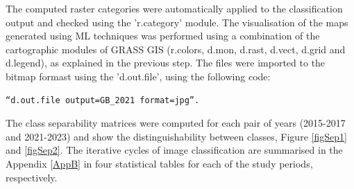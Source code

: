 \documentclass[jimaging,article,submit,pdftex,moreauthors]{Definitions/mdpi}
\begin{document}
The computed raster categories were automatically applied to the classification output and checked using the 'r.category' module. The visualisation of the maps generated using ML techniques was performed using a combination of the cartographic modules of GRASS GIS (r.colors, d.mon, d.rast, d.vect, d.grid and d.legend), as explained in the previous step. The files were imported to the bitmap formast using the 'd.out.file', using the following code:

 \begin{verbatim}
“d.out.file output=GB_2021 format=jpg”.
\end{verbatim}

The class separability matrices were computed for each pair of years (2015-2017 and 2021-2023) and show the distinguishability between classes, Figure \ref{figSep1} and \ref{figSep2}. The iterative cycles of image classification are summarised in the Appendix \ref{AppB} in four statistical tables for each of the study periods, respectively.  
\end{document}
